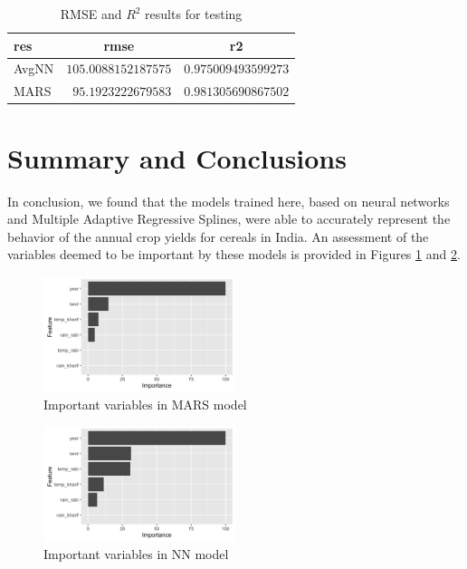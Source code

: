 \documentclass[conference]{IEEEtran}
\begin{document}
\begin{table}[!tbp]
\begin{center}
\begin{tabular}{lrr}
\hline\hline
\multicolumn{1}{l}{res}&\multicolumn{1}{c}{rmse}&\multicolumn{1}{c}{r2}\tabularnewline
\hline
AvgNN&$105.0088152187575$&$0.975009493599273$\tabularnewline
MARS&$ 95.1923222679583$&$0.981305690867502$\tabularnewline
\hline
\end{tabular}\end{center}
\caption{RMSE and $R^2$ results for testing}
\label{tab:res_test}
\end{table}

\section{Summary and Conclusions}
In conclusion, we found that the models trained here, based on neural networks and Multiple Adaptive Regressive Splines, were able to accurately represent the behavior of the annual crop yields for cereals in India. An assessment of the variables deemed to be important by these models is provided in Figures \ref{res:mars_imp} and \ref{res:avgnn_imp}.
\begin{figure}[!h]
    \centering
    \includegraphics[width=0.5\textwidth]{mars_varimp.png}
    \caption{Important variables in MARS model}
    \label{res:mars_imp}
\end{figure}
\begin{figure}[!h]
    \centering
    \includegraphics[width=0.5\textwidth]{avgnn_varimp.png}
    \caption{Important variables in NN model}
    \label{res:avgnn_imp}
\end{figure}
\end{document}
